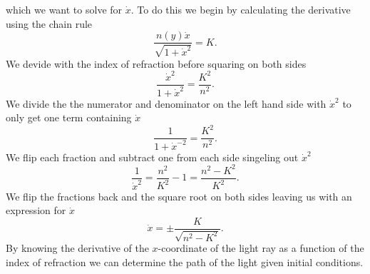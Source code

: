 \documentclass[12pt,twoside]{article}
\begin{document}
which we want to solve for $\dot{x}$. To do this we begin by calculating the derivative using the chain rule
\begin{equation}
   \frac{n(y)\dot{x}}{\sqrt{1+\dot{x}^2}} = K.
\end{equation}
We devide with the index of refraction before squaring on both sides
\begin{equation}
   \frac{\dot{x}^2}{1+\dot{x}^2} = \frac{K^2}{n^2}.
\end{equation}
We divide the the numerator and denominator on the left hand side with $\dot{x}^2$ to only get one term containing $\dot{x}$
\begin{equation}
   \frac{1}{1+\dot{x}^{-2}} = \frac{K^2}{n^2}.
\end{equation}
We flip each fraction and subtract one from each side singeling out $\dot{x}^2$
\begin{equation}
   \frac{1}{\dot{x}^{2}} = \frac{n^2}{K^2}-1 = \frac{n^2-K^2}{K^2}.
\end{equation}
We flip the fractions back and the square root on both sides leaving us with an expression for $\dot{x}$
\begin{equation}
   \dot{x} = \pm\frac{K}{\sqrt{n^2-K^2}}. \label{2a}
\end{equation}
By knowing the derivative of the $x$-coordinate of the light ray as a function of the index of refraction we can determine the path of the light given initial conditions.
\end{document}
